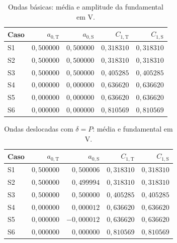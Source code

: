 \begin{table}[H]
\centering
\footnotesize\setlength{\tabcolsep}{3.5pt}
\caption{Ondas básicas: média e amplitude da fundamental em V.}\label{tab:fft}
\begin{tabular}{lrrrr}\hline
Caso & $a_{0,\mathrm T}$ & $a_{0,\mathrm S}$ & $C_{1,\mathrm T}$ & $C_{1,\mathrm S}$ \\ \hline
S1 & $0{,}500000$ & $0{,}500000$ & $0{,}318310$ & $0{,}318310$ \\
S2 & $0{,}500000$ & $0{,}500000$ & $0{,}318310$ & $0{,}318310$ \\
S3 & $0{,}500000$ & $0{,}500000$ & $0{,}405285$ & $0{,}405285$ \\
S4 & $0{,}000000$ & $0{,}000000$ & $0{,}636620$ & $0{,}636620$ \\
S5 & $0{,}000000$ & $0{,}000000$ & $0{,}636620$ & $0{,}636620$ \\
S6 & $0{,}000000$ & $0{,}000000$ & $0{,}810569$ & $0{,}810569$ \\
\hline\end{tabular}
\end{table}
\begin{table}[H]
\centering
\footnotesize\setlength{\tabcolsep}{3.5pt}
\caption{Ondas deslocadas com $\delta=P$: média e fundamental em V.}\label{tab:fft_P}
\begin{tabular}{lrrrr}\hline
Caso & $a_{0,\mathrm T}$ & $a_{0,\mathrm S}$ & $C_{1,\mathrm T}$ & $C_{1,\mathrm S}$ \\ \hline
S1 & $0{,}500000$ & $0{,}500006$ & $0{,}318310$ & $0{,}318310$ \\
S2 & $0{,}500000$ & $0{,}499994$ & $0{,}318310$ & $0{,}318310$ \\
S3 & $0{,}500000$ & $0{,}500000$ & $0{,}405285$ & $0{,}405285$ \\
S4 & $0{,}000000$ & $0{,}000012$ & $0{,}636620$ & $0{,}636620$ \\
S5 & $0{,}000000$ & $-0{,}000012$ & $0{,}636620$ & $0{,}636620$ \\
S6 & $0{,}000000$ & $0{,}000000$ & $0{,}810569$ & $0{,}810569$ \\
\hline\end{tabular}
\end{table}
